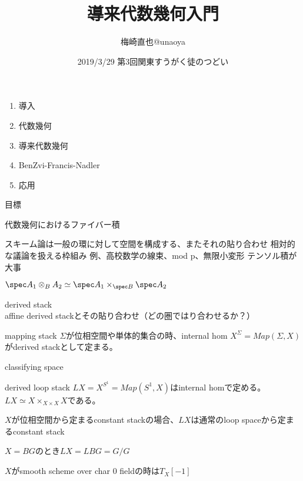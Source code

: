 \documentclass[dvipdfmx]{beamer}
\title{導来代数幾何入門}
\author{梅崎直也@unaoya}
\date{2019/3/29 第3回関東すうがく徒のつどい}
\begin{document}
\begin{frame}
\maketitle
\end{frame}

\begin{frame}
\begin{enumerate}
\item 導入
\item 代数幾何
\item 導来代数幾何
\item BenZvi-Francis-Nadler
\item 応用
\end{enumerate}
\end{frame}

\begin{frame}{目標}
\end{frame}

\begin{frame}{代数幾何におけるファイバー積}

スキーム論は一般の環に対して空間を構成する、またそれの貼り合わせ
相対的な議論を扱える枠組み
例、高校数学の線束、mod p、無限小変形
テンソル積が大事

$\spec A_1\otimes_BA_2\simeq\spec A_1\times_{\spec B}\spec A_2$
\end{frame}

\begin{frame}{derived stack}
affine derived stackとその貼り合わせ（どの圏ではり合わせるか？）
\end{frame}

\begin{frame}{mapping stack}
$\Sigma$が位相空間や単体的集合の時、internal hom $X^\Sigma=Map(\Sigma,X)$がderived stackとして定まる。
\end{frame}

\begin{frame}{classifying space}
\end{frame}

\begin{frame}{derived loop stack}
$LX=X^{S^1}=Map(S^1,X)$はinternal homで定める。
$LX \simeq X\times_{X\times X}X$である。

$X$が位相空間から定まるconstant stackの場合、$LX$は通常のloop spaceから定まるconstant stack

$X=BG$のとき$LX=LBG=G/G$

$X$がsmooth scheme over char $0$ fieldの時は$T_X[-1]$
\end{frame}
\end{document}
